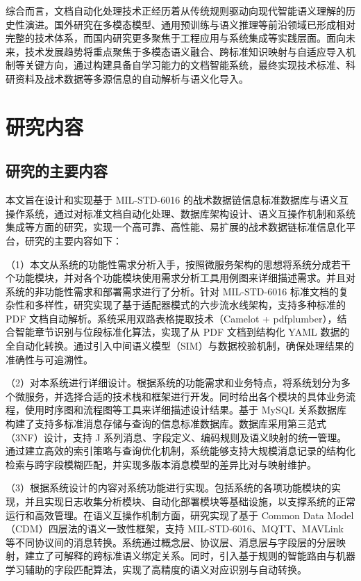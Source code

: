 综合而言，文档自动化处理技术正经历着从传统规则驱动向现代智能语义理解的历史性演进。国外研究在多模态模型、通用预训练与语义推理等前沿领域已形成相对完整的技术体系，而国内研究更多聚焦于工程应用与系统集成等实践层面。面向未来，技术发展趋势将重点聚焦于多模态语义融合、跨标准知识映射与自适应导入机制等关键方向，通过构建具备自学习能力的文档智能系统，最终实现技术标准、科研资料及战术数据等多源信息的自动解析与语义化导入。




\section{研究内容}

\subsection{研究的主要内容}

本文旨在设计和实现基于 MIL-STD-6016 的战术数据链信息标准数据库与语义互操作系统，通过对标准文档自动化处理、数据库架构设计、语义互操作机制和系统集成等方面的研究，实现一个高可靠、高性能、易扩展的战术数据链标准信息化平台，研究的主要内容如下：

（1）本文从系统的功能性需求分析入手，按照微服务架构的思想将系统分成若干个功能模块，并对各个功能模块使用需求分析工具用例图来详细描述需求。并且对系统的非功能性需求和部署需求进行了分析。针对 MIL-STD-6016 标准文档的复杂性和多样性，研究实现了基于适配器模式的六步流水线架构，支持多种标准的 PDF 文档自动解析\cite{MIL_STD_6016_Active_2024,MITRE_Link16_Interoperability_2024}。系统采用双路表格提取技术（Camelot + pdfplumber），结合智能章节识别与位段标准化算法，实现了从 PDF 文档到结构化 YAML 数据的全自动化转换。通过引入中间语义模型（SIM）与数据校验机制，确保处理结果的准确性与可追溯性。

（2）对本系统进行详细设计。根据系统的功能需求和业务特点，将系统划分为多个微服务，并选择合适的技术栈和框架进行开发。同时给出各个模块的具体业务流程，使用时序图和流程图等工具来详细描述设计结果。基于 MySQL 关系数据库构建了支持多标准消息存储与查询的信息标准数据库\cite{Laigner2021Data,Waseem2021Design}。数据库采用第三范式（3NF）设计，支持 J 系列消息、字段定义、编码规则及语义映射的统一管理。通过建立高效的索引策略与查询优化机制，系统能够支持大规模消息记录的结构化检索与跨字段模糊匹配，并实现多版本消息模型的差异比对与映射维护。

（3）根据系统设计的内容对系统功能进行实现。包括系统的各项功能模块的实现，并且实现日志收集分析模块、自动化部署模块等基础设施，以支撑系统的正常运行和高效管理。在语义互操作机制方面，研究实现了基于 Common Data Model（CDM）四层法的语义一致性框架，支持 MIL-STD-6016、MQTT、MAVLink 等不同协议间的消息转换\cite{Hamdan2023Reference,MITRE_Link16_Interoperability_2024}。系统通过概念层、协议层、消息层与字段层的分层映射，建立了可解释的跨标准语义绑定关系。同时，引入基于规则的智能路由与机器学习辅助的字段匹配算法，实现了高精度的语义对应识别与自动转换。

